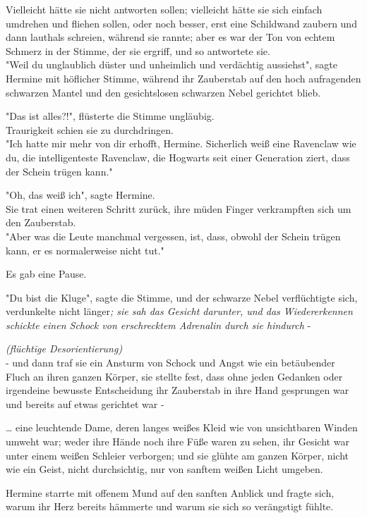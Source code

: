 {Vielleicht hätte sie nicht antworten sollen; vielleicht hätte sie sich einfach umdrehen und fliehen sollen, oder noch besser, erst eine Schildwand zaubern und dann lauthals schreien, während sie rannte; aber es war der Ton von echtem Schmerz in der Stimme, der sie ergriff, und so antwortete sie.\\ "Weil du unglaublich düster und unheimlich und verdächtig aussiehst", sagte Hermine mit höflicher Stimme, während ihr Zauberstab auf den hoch aufragenden schwarzen Mantel und den gesichtslosen schwarzen Nebel gerichtet blieb.

"Das ist alles?!", flüsterte die Stimme ungläubig.\\ Traurigkeit schien sie zu durchdringen.\\ "Ich hatte mir mehr von dir erhofft, Hermine. Sicherlich weiß eine Ravenclaw wie du, die intelligenteste Ravenclaw, die Hogwarts seit einer Generation ziert, dass der Schein trügen kann."

"Oh, das weiß ich", sagte Hermine.\\ Sie trat einen weiteren Schritt zurück, ihre müden Finger verkrampften sich um den Zauberstab.\\ "Aber was die Leute manchmal vergessen, ist, dass, obwohl der Schein trügen kann, er es normalerweise nicht tut."

Es gab eine Pause.

"Du bist die Kluge", sagte die Stimme, und der schwarze Nebel verflüchtigte sich, verdunkelte nicht länger\emph{; sie sah das Gesicht darunter, und das Wiedererkennen schickte einen Schock von erschrecktem Adrenalin durch sie hindurch} -

\emph{(flüchtige Desorientierung)}\\ \emph{\hfill\break } - und dann traf sie ein Ansturm von Schock und Angst wie ein betäubender Fluch an ihren ganzen Körper, sie stellte fest, dass ohne jeden Gedanken oder irgendeine bewusste Entscheidung ihr Zauberstab in ihre Hand gesprungen war und bereits auf etwas gerichtet war -

… eine leuchtende Dame, deren langes weißes Kleid wie von unsichtbaren Winden umweht war; weder ihre Hände noch ihre Füße waren zu sehen, ihr Gesicht war unter einem weißen Schleier verborgen; und sie glühte am ganzen Körper, nicht wie ein Geist, nicht durchsichtig, nur von sanftem weißen Licht umgeben.

Hermine starrte mit offenem Mund auf den sanften Anblick und fragte sich, warum ihr Herz bereits hämmerte und warum sie sich so verängstigt fühlte.

}
